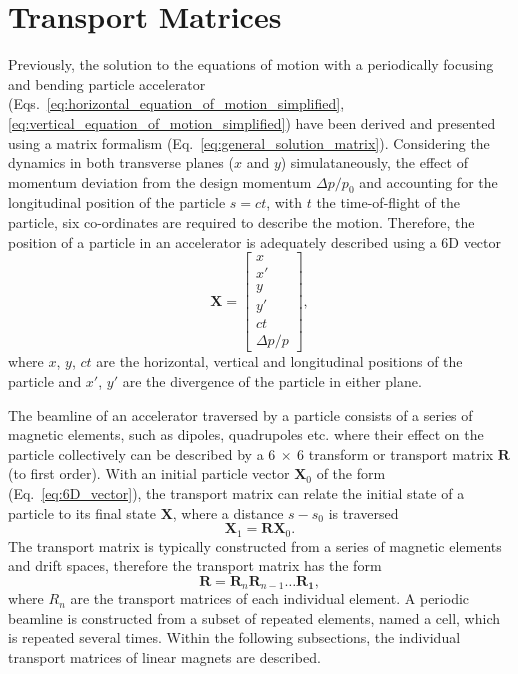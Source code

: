 \documentclass[../main.tex]{subfiles}
\begin{document}
\section{Transport Matrices} 

Previously, the solution to the equations of motion with a periodically focusing and bending particle accelerator (Eqs.~\ref{eq:horizontal_equation_of_motion_simplified}, \ref{eq:vertical_equation_of_motion_simplified}) have been derived and presented using a matrix formalism (Eq.~\ref{eq:general_solution_matrix}). Considering the dynamics in both transverse planes ($x$ and $y$) simulataneously, the effect of momentum deviation from the design momentum $\Delta p/p_{0}$ and accounting for the longitudinal position of the particle $s=ct$, with $t$ the time-of-flight of the particle, six co-ordinates are required to describe the motion. Therefore, the position of a particle in an accelerator is adequately described using a 6D vector 
\begin{equation}
\boldsymbol{X} = 
\begin{bmatrix}
x \\
x' \\
y \\
y' \\
ct \\
\Delta p/p
\end{bmatrix},
\label{eq:6D_vector}
\end{equation}
where $x$, $y$, $ct$ are the horizontal, vertical and longitudinal positions of the particle and $x'$, $y'$ are the divergence of the particle in either plane.

The beamline of an accelerator traversed by a particle consists of a series of magnetic elements, such as dipoles, quadrupoles etc. where their effect on the particle collectively can be described by a $6~\times~6$ transform or transport matrix $\boldsymbol{R}$ (to first order). With an initial particle vector $\boldsymbol{X}_{0}$ of the form (Eq.~\ref{eq:6D_vector}), the transport matrix can relate the initial state of a particle to its final state $\boldsymbol{X}$, where a distance $s-s_{0}$ is traversed
\begin{equation}
\boldsymbol{X}_{1} = \boldsymbol{R}\boldsymbol{X}_{0}.
\label{eq:overall_transport_matrix}
\end{equation}
The transport matrix is typically constructed from a series of magnetic elements and drift spaces, therefore the transport matrix has the form
\begin{equation}
\boldsymbol{R} = \boldsymbol{R}_{n}\boldsymbol{R}_{n-1}\ldots\boldsymbol{R_{1}},
\label{eq:subseries_transport_matrix}    
\end{equation}
where $R_{n}$ are the transport matrices of each individual element. A periodic beamline is constructed from a subset of repeated  elements, named a cell, which is repeated several times. Within the following subsections, the individual transport matrices of linear magnets are described. 
\end{document}
